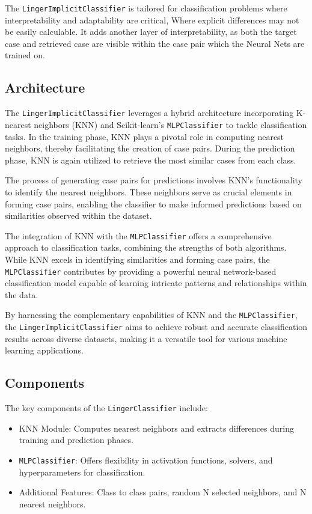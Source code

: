 \documentclass[a4paper, 12pt]{report}
\begin{document}
The \texttt{LingerImplicitClassifier} is tailored for classification problems where interpretability and adaptability are critical, Where explicit differences may not be easily calculable.
It adds another layer of interpretability, as both the target case and retrieved case are visible within the case pair which the Neural Nets are trained on.

\subsection{Architecture}
The \texttt{LingerImplicitClassifier} leverages a hybrid architecture incorporating K-nearest neighbors (KNN) and Scikit-learn's \texttt{MLPClassifier} to tackle classification tasks.
In the training phase, KNN plays a pivotal role in computing nearest neighbors, thereby facilitating the creation of case pairs.
During the prediction phase, KNN is again utilized to retrieve the most similar cases from each class.

The process of generating case pairs for predictions involves KNN's functionality to identify the nearest neighbors. 
These neighbors serve as crucial elements in forming case pairs, enabling the classifier to make informed predictions based on similarities observed within the dataset.

The integration of KNN with the \texttt{MLPClassifier} offers a comprehensive approach to classification tasks, combining the strengths of both algorithms. 
While KNN excels in identifying similarities and forming case pairs, the \texttt{MLPClassifier} contributes 
by providing a powerful neural network-based classification model capable of learning intricate patterns and relationships within the data.

By harnessing the complementary capabilities of KNN and the \texttt{MLPClassifier}, 
the \texttt{LingerImplicitClassifier} aims to achieve robust and accurate classification results across diverse datasets,
making it a versatile tool for various machine learning applications.

\subsection{Components}
The key components of the \texttt{LingerClassifier} include:
\begin{itemize}
    \item KNN Module: Computes nearest neighbors and extracts differences during training and prediction phases.
    \item \texttt{MLPClassifier}: Offers flexibility in activation functions, solvers, and hyperparameters for classification.
    \item Additional Features: Class to class pairs, random N selected neighbors, and N nearest neighbors.
\end{itemize}
\end{document}
